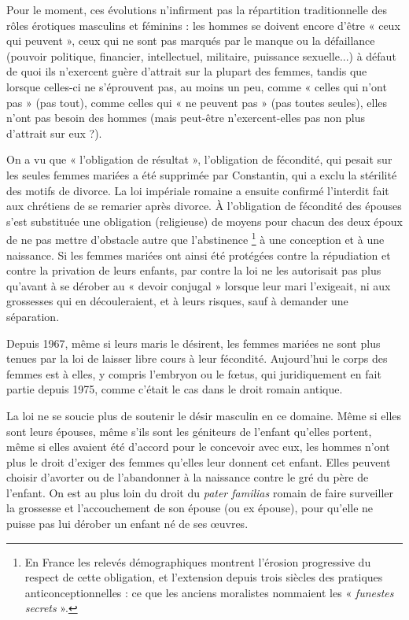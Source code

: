  Pour le moment, ces évolutions n'infirment pas la répartition traditionnelle des rôles érotiques masculins et féminins : les hommes se doivent encore d'être « ceux qui peuvent », ceux qui ne sont pas marqués par le manque ou la défaillance (pouvoir politique, financier, intellectuel, militaire, puissance sexuelle...) à défaut de quoi ils n'exercent guère d'attrait sur la plupart des femmes, tandis que lorsque celles-ci ne s'éprouvent pas, au moins un peu, comme « celles qui n'ont pas » (pas tout), comme celles qui « ne peuvent pas » (pas toutes seules), elles n'ont pas besoin des hommes (mais peut-être n'exercent-elles pas non plus d'attrait sur eux ?).
 
 On a vu que « l'obligation de résultat », l'obligation de fécondité, qui pesait sur les seules femmes mariées a été supprimée par Constantin, qui a exclu la stérilité des motifs de divorce. La loi impériale romaine a ensuite confirmé l'interdit fait aux chrétiens de se remarier après divorce. À l'obligation de fécondité des épouses s'est substituée une obligation (religieuse) de moyens pour chacun des deux époux de ne pas mettre d'obstacle autre que l'abstinence%
\footnote{En France les relevés démographiques montrent l'érosion progressive du respect de cette obligation, et l'extension depuis trois siècles des pratiques anticonceptionnelles : ce que les anciens moralistes nommaient les « \emph{funestes secrets} ».} 
à une conception et à une naissance. Si les femmes mariées ont ainsi été protégées contre la répudiation et contre la privation de leurs enfants, par contre la loi ne les autorisait pas plus qu'avant à se dérober au « devoir conjugal » lorsque leur mari l'exigeait, ni aux grossesses qui en découleraient, et à leurs risques, sauf à demander une séparation. 

 Depuis 1967, même si leurs maris le désirent, les femmes mariées ne sont plus tenues par la loi de laisser libre cours à leur fécondité. Aujourd'hui le corps des femmes est à elles, y compris l'embryon ou le fœtus, qui juridiquement en fait partie depuis 1975, comme c'était le cas dans le droit romain antique. 

 La loi ne se soucie plus de soutenir le désir masculin en ce domaine. Même si elles sont leurs épouses, même s'ils sont les géniteurs de l'enfant qu'elles portent, même si elles avaient été d'accord pour le concevoir avec eux, les hommes n'ont plus le droit d'exiger des femmes qu'elles leur donnent cet enfant. Elles peuvent choisir d'avorter ou de l'abandonner à la naissance contre le gré du père de l'enfant. On est au plus loin du droit du \emph{pater familias} romain de faire surveiller la grossesse et l'accouchement de son épouse (ou ex épouse), pour qu'elle ne puisse pas lui dérober un enfant né de ses œuvres.

